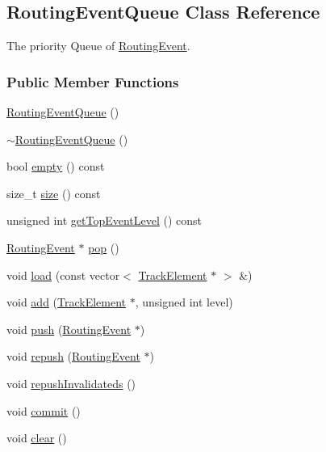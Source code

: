 \hypertarget{classKite_1_1RoutingEventQueue}{\subsection{Routing\-Event\-Queue Class Reference}
\label{classKite_1_1RoutingEventQueue}
}


The priority Queue of \hyperlink{classKite_1_1RoutingEvent}{Routing\-Event}.  


\subsubsection*{Public Member Functions}
\begin{DoxyCompactItemize}
\item 
\hyperlink{classKite_1_1RoutingEventQueue_a67dd3abe4f9f4f32e91dfaa9573976ca}{Routing\-Event\-Queue} ()
\item 
\hyperlink{classKite_1_1RoutingEventQueue_a28ed9894863ae1029f16744a86d4bfab}{$\sim$\-Routing\-Event\-Queue} ()
\item 
bool \hyperlink{classKite_1_1RoutingEventQueue_ac6e61de369e994009e36f344f99c15ad}{empty} () const 
\item 
size\-\_\-t \hyperlink{classKite_1_1RoutingEventQueue_aac782da1f912bceb5d8ad00c8dc892ac}{size} () const 
\item 
unsigned int \hyperlink{classKite_1_1RoutingEventQueue_a1d37043eb2c09e1ac1908f5e331f02e5}{get\-Top\-Event\-Level} () const 
\item 
\hyperlink{classKite_1_1RoutingEvent}{Routing\-Event} $\ast$ \hyperlink{classKite_1_1RoutingEventQueue_af1b85d0b49565932c55ec55625cd8838}{pop} ()
\item 
void \hyperlink{classKite_1_1RoutingEventQueue_ae119583092a1b62653cf8b009cdb564f}{load} (const vector$<$ \hyperlink{classKite_1_1TrackElement}{Track\-Element} $\ast$ $>$ \&)
\item 
void \hyperlink{classKite_1_1RoutingEventQueue_af0813b67c9fc72d960f7e512e9403d57}{add} (\hyperlink{classKite_1_1TrackElement}{Track\-Element} $\ast$, unsigned int level)
\item 
void \hyperlink{classKite_1_1RoutingEventQueue_ac802427673567526d06af911e94f7216}{push} (\hyperlink{classKite_1_1RoutingEvent}{Routing\-Event} $\ast$)
\item 
void \hyperlink{classKite_1_1RoutingEventQueue_afd2fa6d6f5d90c472bea9befa97d955d}{repush} (\hyperlink{classKite_1_1RoutingEvent}{Routing\-Event} $\ast$)
\item 
void \hyperlink{classKite_1_1RoutingEventQueue_a4fb0022d3e8f91a862b5f6438b7f8dad}{repush\-Invalidateds} ()
\item 
void \hyperlink{classKite_1_1RoutingEventQueue_ad55316f5135cdae6aa6c5a763f6c3473}{commit} ()
\item 
void \hyperlink{classKite_1_1RoutingEventQueue_ac8bb3912a3ce86b15842e79d0b421204}{clear} ()
\end{DoxyCompactItemize}


